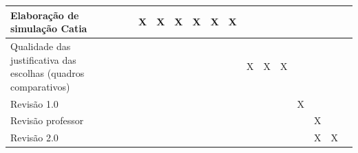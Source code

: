 \begin{table}[H]
\begin{tabular}{|p{2.5cm}|p{0.5cm}|p{0.5cm}|p{0.5cm}|p{0.5cm}|p{0.5cm}|p{0.5cm}|p{0.5cm}|p{0.5cm}|p{0.5cm}|p{0.5cm}|p{0.5cm}|p{0.5cm}|p{0.5cm}|p{0.5cm}|p{0.5cm}|}
    Elaboração de simulação Catia                                   &                           &                           & \cellcolor[HTML]{3166FF}X & \cellcolor[HTML]{3166FF}X & \cellcolor[HTML]{3166FF}X & \cellcolor[HTML]{3166FF}X & \cellcolor[HTML]{3166FF}X & \cellcolor[HTML]{3166FF}X &                           &                           &                           &                           &                           &                           &                           \\ \hline
    Qualidade das justificativa das escolhas (quadros comparativos) &                           &                           &                           &                           &                           &                           &                           &                           & \cellcolor[HTML]{3166FF}X & \cellcolor[HTML]{3166FF}X & \cellcolor[HTML]{3166FF}X &                           &                           &                           &                           \\ \hline
    Revisão 1.0                                                     &                           &                           &                           &                           &                           &                           &                           &                           &                           &                           &                           & \cellcolor[HTML]{3166FF}X &                           &                           &                           \\ \hline
    Revisão professor                                               &                           &                           &                           &                           &                           &                           &                           &                           &                           &                           &                           &                           & \cellcolor[HTML]{3166FF}X &                           &                           \\ \hline
    Revisão 2.0                                                     &                           &                           &                           &                           &                           &                           &                           &                           &                           &                           &                           &                           & \cellcolor[HTML]{3166FF}X & \cellcolor[HTML]{3166FF}X &                           \\ \hline

\end{tabular}
\end{table}

